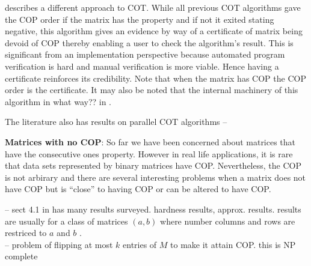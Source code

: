 \documentclass[MS,]{iitmdiss}
\begin{document}
\cite{mcc04} describes a different approach to COT. While all previous
COT algorithms gave the COP order if the matrix has the property and
if not it exited stating negative, this algorithm gives an evidence by
way of a certificate of
matrix being devoid of COP thereby enabling a user to check the
algorithm's result. This is significant from an implementation
perspective because automated program verification is hard and manual
verification is more viable. Hence having a certificate
reinforces its credibility. Note that when the matrix has COP the COP
order is the certificate.  It may also be noted that the internal
machinery of this algorithm  {in what way??} in \cite{co98}.



The literature also has results on parallel COT algorithms --
\cite{as95} \cite{bs03} 
\cite{ly91}



{\bf Matrices with no COP}: So far we have been concerned about matrices that have the consecutive
ones property. However in real life applications, it is rare that data
sets represented by binary matrices have COP. Nevertheless, the COP is
not arbirary and there are several interesting problems when a matrix
does not have COP but is ``close'' to having COP or can be altered to
have COP. 





-- sect 4.1 in \cite{d08phd} has many results surveyed. hardness results,
approx. results. results are usually for a class of matrices $(a,b)$
where number columns and rows are restriced to $a$ and $b$
.\\
-- problem of flipping at most $k$ entries of $M$ to make it attain
COP. this is NP complete \cite{b75-phd}\\
\end{document}
